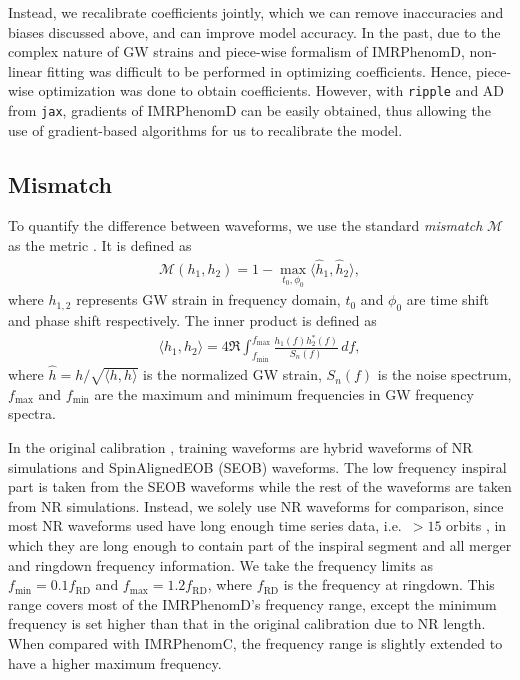 \documentclass[twocolumn]{aastex631}
\newcommand{\ripple}{\texttt{ripple}}
\newcommand{\jax}{\texttt{jax}}
\begin{document}

Instead, we recalibrate coefficients jointly, which we can remove inaccuracies
and biases discussed above, and can improve model accuracy. In the past, due to
the complex nature of GW strains and piece-wise formalism of IMRPhenomD,
non-linear fitting was difficult to be performed in optimizing coefficients.
Hence, piece-wise optimization was done to obtain coefficients. However, with
{\ripple} and AD from \jax, gradients of IMRPhenomD can be easily obtained, thus
allowing the use of gradient-based algorithms for us to recalibrate the model.   

\subsection{Mismatch} \label{subsec:mismatch}

To quantify the difference between waveforms, we use the standard
\textit{mismatch} $\mathcal{M}$ as the metric \citep{husa2016frequency}. It is
defined as 
\begin{align} \label{eq:mismatch}
	\mathcal{M}(h_1, h_2)=1-\max_{t_0, \phi_0}\langle \hat{h}_1, \hat{h}_2\rangle,
\end{align}
where $h_{1,2}$ represents GW strain in frequency domain, $t_0$ and $\phi_0$ are
time shift and phase shift respectively. The inner product is defined as 
\begin{align}\label{eq:inner_prod}
	\langle h_1, h_2 \rangle=4\Re\int_{f_{\mathrm{min}}}^{f_{\mathrm{max}}}\frac{h_1(f)h_2^{\ast}(f)}{S_n(f)}\,df,
\end{align}
where $\hat{h}=h/\sqrt{\langle h, h \rangle}$ is the normalized GW strain,
$S_n(f)$ is the noise spectrum, $f_{\mathrm{max}}$ and $f_{\mathrm{min}}$ are
the maximum and minimum frequencies in GW frequency spectra. 

In the original calibration \citep{khan2016frequency,husa2016frequency},
training waveforms are hybrid waveforms of NR simulations and SpinAlignedEOB
(SEOB) waveforms. The low frequency inspiral part is taken from the SEOB
waveforms while the rest of the waveforms are taken from NR simulations.
Instead, we solely use NR waveforms for comparison, since most NR waveforms used
have long enough time series data, i.e.~$>15$ orbits \citep{boyle2019sxs}, in
which they are long enough to contain part of the inspiral segment and all
merger and ringdown frequency information. We take the frequency limits as
$f_{\mathrm{min}}=0.1f_{\mathrm{RD}}$ and $f_{\mathrm{max}}=1.2f_{\mathrm{RD}}$,
where $f_{\mathrm{RD}}$ is the frequency at ringdown. This range covers most of
the IMRPhenomD's frequency range, except the minimum frequency is set higher
than that in the original calibration due to NR length. When compared with
IMRPhenomC, the frequency range is slightly extended to have a higher maximum
frequency. 
\end{document}
